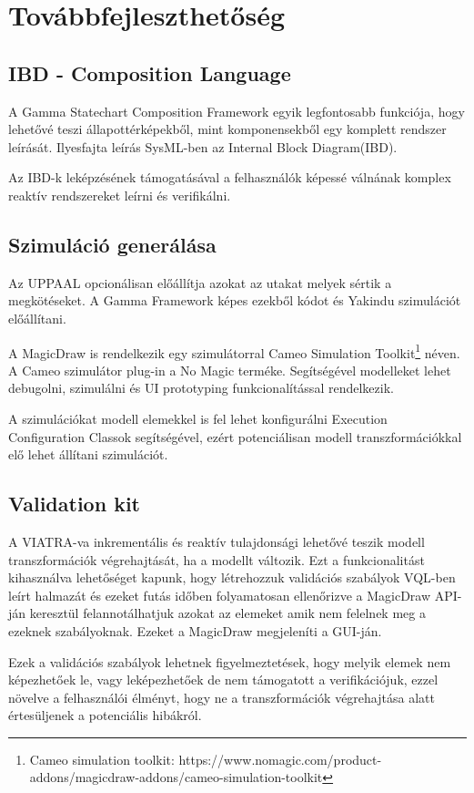 \chapter{Továbbfejleszthetőség}

\section{IBD - Composition Language}
A Gamma Statechart Composition Framework egyik legfontosabb funkciója, hogy lehetővé teszi állapottérképekből, mint komponensekből egy komplett rendszer leírását. Ilyesfajta leírás SysML-ben az Internal Block Diagram(IBD).

Az IBD-k leképzésének támogatásával a felhasználók képessé válnának komplex reaktív rendszereket leírni és verifikálni.

\section{Szimuláció generálása}

Az UPPAAL opcionálisan előállítja azokat az utakat melyek sértik a megkötéseket. A Gamma Framework képes ezekből kódot és Yakindu szimulációt előállítani.

A MagicDraw is rendelkezik egy szimulátorral Cameo Simulation Toolkit\footnote{Cameo simulation toolkit: https://www.nomagic.com/product-addons/magicdraw-addons/cameo-simulation-toolkit} néven. A Cameo szimulátor plug-in a No Magic terméke. Segítségével modelleket lehet debugolni, szimulálni és UI prototyping funkcionalítással rendelkezik.

A szimulációkat modell elemekkel is fel lehet konfigurálni Execution Configuration Classok segítségével, ezért potenciálisan modell transzformációkkal elő lehet állítani szimulációt.

\section{Validation kit}

A VIATRA-va inkrementális és reaktív tulajdonsági lehetővé teszik modell transzformációk végrehajtását, ha a modellt változik. Ezt a funkcionalitást kihasználva lehetőséget kapunk, hogy létrehozzuk validációs szabályok VQL-ben leírt halmazát és ezeket futás időben folyamatosan ellenőrizve a MagicDraw API-ján keresztül felannotálhatjuk azokat az elemeket amik nem felelnek meg a ezeknek szabályoknak. Ezeket a MagicDraw megjeleníti a GUI-ján.

Ezek a validációs szabályok lehetnek figyelmeztetések, hogy melyik elemek nem képezhetőek le, vagy leképezhetőek de nem támogatott a verifikációjuk, ezzel növelve a felhasználói élményt, hogy ne a transzformációk végrehajtása alatt értesüljenek a potenciális hibákról.




